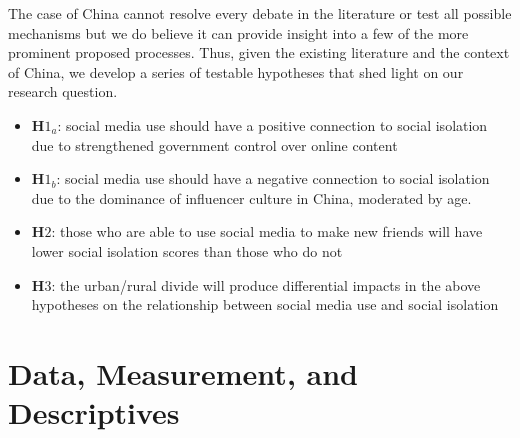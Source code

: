 \documentclass[]{interact}
\theoremstyle{plain}%
\theoremstyle{definition}
\theoremstyle{remark}
\begin{document}
The case of China cannot resolve every debate in the literature or test
all possible mechanisms but we do believe it can provide insight into a
few of the more prominent proposed processes. Thus, given the existing
literature and the context of China, we develop a series of testable
hypotheses that shed light on our research question.

\begin{itemize}
\item
  \textbf{H}\(1_a\): social media use should have a positive connection
  to social isolation due to strengthened government control over online
  content
\item
  \textbf{H}\(1_b\): social media use should have a negative connection
  to social isolation due to the dominance of influencer culture in
  China, moderated by age.
\item
  \textbf{H}\(2\): those who are able to use social media to make new
  friends will have lower social isolation scores than those who do not
\item
  \textbf{H}\(3\): the urban/rural divide will produce differential
  impacts in the above hypotheses on the relationship between social
  media use and social isolation
\end{itemize}

\section{Data, Measurement, and
Descriptives}\label{data-measurement-and-descriptives}
\end{document}
